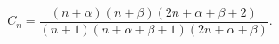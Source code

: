\[C_{n}=\dfrac{(n+\alpha)(n+\beta)(2n+\alpha+\beta+2)}{(n+1)(n+\alpha+\beta+1)(2%
n+\alpha+\beta)}.\]